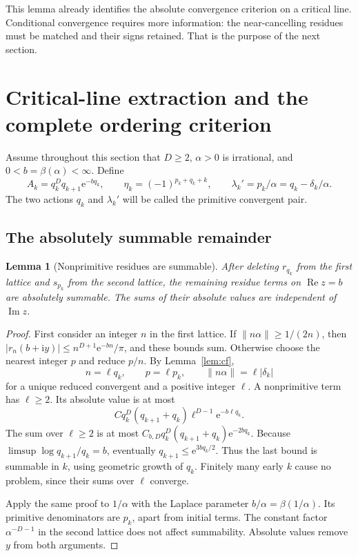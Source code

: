 \documentclass[11pt,a4paper]{article}
\numberwithin{equation}{section}
\newtheorem{lemma}[theorem]{Lemma}
\theoremstyle{definition}
\theoremstyle{remark}
\newcommand{\e}{\mathrm e}
\newcommand{\ii}{\mathrm i}
\newcommand{\re}{\operatorname{Re}}
\newcommand{\im}{\operatorname{Im}}
\begin{document}
This lemma already identifies the absolute convergence criterion on a
critical line. Conditional convergence requires more information: the
near-cancelling residues must be matched and their signs retained. That
is the purpose of the next section.

\section{Critical-line extraction and the complete ordering criterion}
\label{sec:critical}
Assume throughout this section that $D\ge2$, $\alpha>0$ is irrational,
and $0<b=\beta(\alpha)<\infty$. Define
\begin{equation}
 A_k=q_k^Dq_{k+1}\e^{-bq_k},\qquad
 \eta_k=(-1)^{p_k+q_k+k},\qquad
 \lambda_k'=p_k/\alpha=q_k-\delta_k/\alpha.
 \label{eq:critical-data}
\end{equation}
The two actions $q_k$ and $\lambda_k'$ will be called the primitive
convergent pair.

\subsection{The absolutely summable remainder}

\begin{lemma}[Nonprimitive residues are summable]
\label{lem:nonprimitive}
After deleting $r_{q_k}$ from the first lattice and $s_{p_k}$ from the
second lattice, the remaining residue terms on $\re z=b$ are absolutely
summable. The sums of their absolute values are independent of $\im z$.
\end{lemma}
\begin{proof}
First consider an integer $n$ in the first lattice. If
$\|n\alpha\|\ge1/(2n)$, then
$|r_n(b+\ii y)|\le n^{D+1}\e^{-bn}/\pi$, and these bounds sum.
Otherwise choose the nearest integer $p$ and reduce $p/n$. By
Lemma~\ref{lem:cf},
\[
 n=\ell q_k,\qquad p=\ell p_k,\qquad
 \|n\alpha\|=\ell|\delta_k|
\]
for a unique reduced convergent and a positive integer $\ell$.
A nonprimitive term has $\ell\ge2$. Its absolute value is at most
\[
 C q_k^D(q_{k+1}+q_k)\ell^{D-1}\e^{-b\ell q_k}.
\]
The sum over $\ell\ge2$ is at most
$C_{b,D}q_k^D(q_{k+1}+q_k)\e^{-2bq_k}$.
Because $\limsup\log q_{k+1}/q_k=b$, eventually
$q_{k+1}\le\e^{3bq_k/2}$. Thus the last bound is summable in $k$,
using geometric growth of $q_k$. Finitely many early $k$ cause no
problem, since their sums over $\ell$ converge.

Apply the same proof to $1/\alpha$ with the Laplace parameter
$b/\alpha=\beta(1/\alpha)$. Its primitive denominators are $p_k$, apart
from initial terms. The constant factor $\alpha^{-D-1}$ in the second
lattice does not affect summability. Absolute values remove $y$ from
both arguments.
\end{proof}
\end{document}
